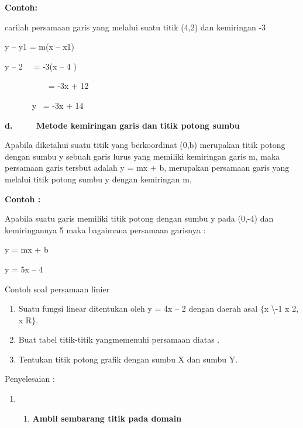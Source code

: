 \documentclass[11pt,fleqn]{book} %
\begin{document}
\noindent \textbf{}

\noindent \textbf{Contoh:}

\noindent \textbf{}

\noindent carilah persamaan garis yang melalui suatu titik (4,2) dan kemiringan -3

\noindent 

\noindent y -- y1 = m(x -- x1)

\noindent y -- 2~~ = -3(x -- 4 )

\noindent ~~~~~~~~~~ = -3x + 12

\noindent ~~~~~~ y~ = -3x + 14

\noindent 

\noindent \textbf{d.~~~~~Metode kemiringan garis dan titik potong sumbu}

\noindent Apabila diketahui suatu titik yang berkoordinat (0,b) merupakan titik potong dengan sumbu y sebuah garis lurus yang memiliki kemiringan garis m, maka persamaan garis tersbut adalah y = mx + b, merupakan persamaan garis yang melalui titik potong sumbu y dengan kemiringan m, 

\noindent 

\noindent \textbf{Contoh :}

\noindent \textbf{}

\noindent Apabila suatu garis memiliki titik potong dengan sumbu y pada (0,-4) dan kemiringannya 5 maka bagaimana persamaan garisnya :

\noindent 

\noindent y = mx + b

\noindent y = 5x -- 4

\noindent 

\noindent \eject Contoh soal persamaan linier

\begin{enumerate}
\item  Suatu fungsi linear ditentukan oleh y = 4x -- 2 dengan daerah asal $\{$x {\textbackslash}-1    x    2, x    R$\}$.

\item  Buat tabel titik-titik yangmemenuhi persamaan diatas .

\item  Tentukan titik potong grafik dengan sumbu X dan sumbu Y.
\end{enumerate}

\noindent Penyelesaian :

\begin{enumerate}
\item \begin{enumerate}
\item  \textbf{Ambil sembarang titik pada domain}
\end{enumerate}
\end{enumerate}
\end{document}
